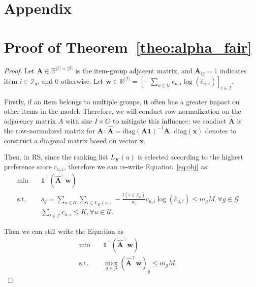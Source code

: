 \newpage

\appendix
\section*{Appendix}

\section{Proof of Theorem~\ref{theo:alpha_fair}}\label{app:prof_alpha_fair}

\begin{proof}
    Let $\bm{A}\in\mathbb{R}^{|\mathcal{I}|\times|\mathcal{G}|}$ is the item-group adjacent matrix, and $\bm{A}_{ig} = 1$ indicates item $i\in \mathcal{I}_g$, and 0 otherwise. Let $\bm{w}\in\mathbb{R}^{|\mathcal{I}|} = [-\sum_{u\in\mathcal{U}}c_{u,i}\log(\hat{c}_{u,i})]_{i\in\mathcal{I}}$. 

    Firstly, if an item belongs to multiple groups, it often has a greater impact on other items in the model. Therefore, we will conduct row normalization on the adjacency matrix $A$ with size $I \times G$ to mitigate this influence: we conduct $\hat{\bm{A}}$ is the row-normalized matrix for $\bm{A}$: $\hat{\bm{A}}=\text{diag}(\bm{A}\bm{1})^{-1}\bm{A}$. $\text{diag}(\bm{x})$ denotes to construct a diagonal matrix based on vector $\bm{x}$.

    Then, in RS, since the ranking list $L_K(u)$ is selected according to the highest preference score $c_{u,i}$, therefore
    we can re-write Equation~\eqref{eq:obj} as:
    \begin{equation}
    \begin{aligned}
        \min \quad& \bm{1}^{\top}(\hat{\bm{A}}^{\top}\bm{w}) \\
            \textrm{s.t.}\quad & s_g = \sum_{u\in\mathcal{U}} \sum_{i\in L_K(u)} -\frac{\mathbb{I}(i\in \mathcal{I}_g)}{n_i}c_{u,i}\log(\hat{c}_{u,i}) \leq m_g M, \forall g\in\mathcal{G} \\
            & \sum_{i\in\mathcal{I}} c_{u,i} \leq K, \forall u\in\mathcal{U}.
    \end{aligned}
    \end{equation}

    Then we can still write the Equation as
    \begin{equation}
    \begin{aligned}
        \min \quad& \bm{1}^{\top}(\hat{\bm{A}}^{\top}\bm{w}) \\
            \textrm{s.t.}\quad & \max_{g\in\mathcal{G}} (\hat{\bm{A}}^{\top}\bm{w})_g \leq m_g M.
    \end{aligned}
    \end{equation}


\end{proof}
